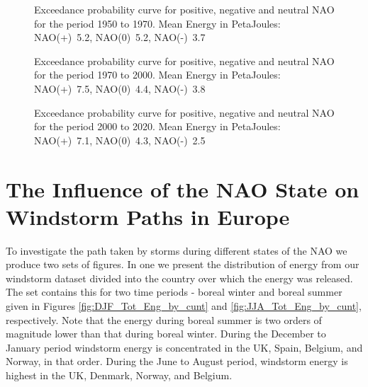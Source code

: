 \begin{figure}[ht]
\begin{minipage}[t]{0.7\textwidth}
            \end{minipage}
            \hfill  %
            \begin{minipage}[t]{0.29\textwidth}
                \vspace*{-215pt}  %
                \caption{Exceedance probability curve for positive, negative and neutral NAO for the period 1950 to 1970. Mean Energy in PetaJoules: NAO(+)~5.2, NAO(0)~5.2, NAO(-)~3.7}
                \label{fig:EP19501970}
                \vspace*{110pt}  %
                \caption{Exceedance probability curve for positive, negative and neutral NAO for the period 1970 to 2000. Mean Energy in PetaJoules: NAO(+)~7.5, NAO(0)~4.4, NAO(-)~3.8}
                \label{fig:EP19702000}
                \vspace*{110pt}  %
                \caption{Exceedance probability curve for positive, negative and neutral NAO for the period 2000 to 2020. Mean Energy in PetaJoules: NAO(+)~7.1, NAO(0)~4.3, NAO(-)~2.5}
                \label{fig:EP20002020}
            \end{minipage}
        \end{figure}

\FloatBarrier
\section{The Influence of the NAO State on Windstorm Paths in Europe}

    To investigate the path taken by storms during different states of the NAO we produce two sets of figures. In one we present the distribution of energy from our windstorm dataset divided into the country over which the energy was released. The set contains this for two time periods - boreal winter and boreal summer given in Figures \ref{fig:DJF_Tot_Eng_by_cunt} and \ref{fig:JJA_Tot_Eng_by_cunt}, respectively. Note that the energy during boreal summer is two orders of magnitude lower than that during boreal winter. During the December to January period windstorm energy is concentrated in the UK, Spain, Belgium, and Norway, in that order. During the June to August period, windstorm energy is highest in the UK, Denmark, Norway, and Belgium.
    
